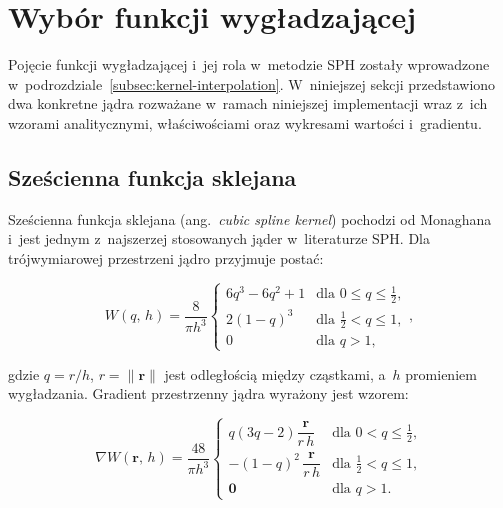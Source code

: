 
\section{Wybór funkcji wygładzającej}

Pojęcie funkcji wygładzającej i~jej rola w~metodzie SPH zostały wprowadzone
w~podrozdziale~\ref{subsec:kernel-interpolation}. W~niniejszej sekcji przedstawiono
dwa konkretne jądra rozważane w~ramach niniejszej implementacji wraz z~ich wzorami
analitycznymi, właściwościami oraz wykresami wartości i~gradientu.

\subsection{Sześcienna funkcja sklejana}

Sześcienna funkcja sklejana (ang.~\textit{cubic spline kernel}) pochodzi od Monaghana
\cite{mon92} i~jest jednym z~najszerzej stosowanych jąder w~literaturze SPH.
Dla trójwymiarowej przestrzeni jądro przyjmuje postać:

\begin{equation}
    W(q,\,h) = \frac{8}{\pi h^3}
    \begin{cases}
        6q^3 - 6q^2 + 1 & \text{dla } 0 \leq q \leq \tfrac{1}{2}, \\
        2(1-q)^3         & \text{dla } \tfrac{1}{2} < q \leq 1, \\
        0                & \text{dla } q > 1,
    \end{cases},
    \label{eq:cubic_kernel}
\end{equation}

gdzie $q = r/h$, $r = \|\mathbf{r}\|$ jest odległością między cząstkami,
a~$h$ promieniem wygładzania. Gradient przestrzenny jądra wyrażony jest wzorem:

\begin{equation}
    \nabla W(\mathbf{r},\,h) = \frac{48}{\pi h^3}
    \begin{cases}
        q\!\left(3q - 2\right)\dfrac{\mathbf{r}}{r\,h} & \text{dla } 0 < q \leq \tfrac{1}{2}, \\[6pt]
        -(1-q)^2\,\dfrac{\mathbf{r}}{r\,h}             & \text{dla } \tfrac{1}{2} < q \leq 1, \\[6pt]
        \mathbf{0}                                       & \text{dla } q > 1.
    \end{cases}
    \label{eq:cubic_grad}
\end{equation}

